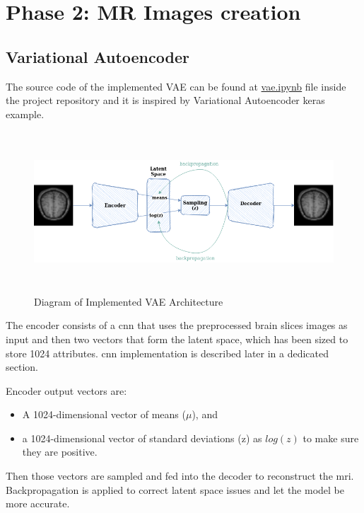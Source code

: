 \section{Phase 2: MR Images creation}

\subsection{Variational Autoencoder}

The source code of the implemented VAE can be found at \href{https://github.com/mtablado/uoc2022_tfm/blob/main/vae.ipynb}{vae.ipynb} file inside the project repository and it is inspired by Variational Autoencoder \cite{vaekeras} keras example.

\begin{figure}[ht]
    \centering
    \includegraphics[width = 16cm, height = 6cm]{images/vae.png}
    \caption[Diagram of Implemented VAE Architecture]{Diagram of Implemented VAE Architecture}
    \label{fig:vaearch}
\end{figure}

The encoder consists of a \acrfull*{cnn} that uses the preprocessed brain slices images as input and then two vectors that form the latent space, which has been sized to store 1024 attributes. \acrshort*{cnn} implementation is described later in a dedicated section.

Encoder output vectors are:

\begin{itemize}
    \item A 1024-dimensional vector of means ($\mu$), and
    \item a 1024-dimensional vector of standard deviations (z) as $log(z)$ to make sure they are positive.
\end{itemize}
 
Then those vectors are sampled and fed into the decoder to reconstruct the \acrshort{mri}. Backpropagation is applied to correct latent space issues and let the model be more accurate.

